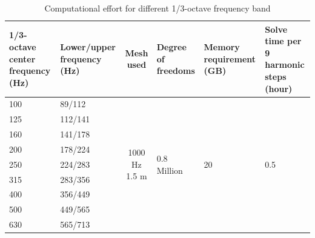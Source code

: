 \begin{table}[H]
	\caption{Computational effort for different 1/3-octave frequency band}
	\begin{tabularx}{\textwidth}{|X|X|c|X|X|X|}
		\hline
		1/3-octave center frequency (Hz) & Lower/upper frequency (Hz) & Mesh used                       & Degree of freedoms            & Memory requirement (GB) & Solve time per 9 harmonic steps (hour) \\ \hline
		100                              & 89/112                     & \multirow{10}{*}{1000 Hz 1.5 m} & \multirow{10}{*}{0.8 Million} & \multirow{10}{*}{20}    & \multirow{10}{*}{0.5}                  \\ \cline{1-2}
		125                              & 112/141                    &                                 &                               &                         &                                        \\ \cline{1-2}
		160                              & 141/178                    &                                 &                               &                         &                                        \\ \cline{1-2}
		200                              & 178/224                    &                                 &                               &                         &                                        \\ \cline{1-2}
		250                              & 224/283                    &                                 &                               &                         &                                        \\ \cline{1-2}
		315                              & 283/356                    &                                 &                               &                         &                                        \\ \cline{1-2}
		400                              & 356/449                    &                                 &                               &                         &                                        \\ \cline{1-2}
		500                              & 449/565                    &                                 &                               &                         &                                        \\ \cline{1-2}
		630                              & 565/713                    &                                 &                               &                         &                                        \\ \cline{1-2}

\end{tabularx}
\end{table}
